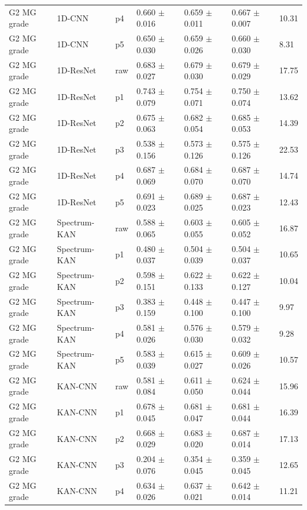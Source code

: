 {\begin{longtable}{L{2.35cm}L{2.4cm}L{1.0cm}L{2.35cm}L{2.25cm}L{2.25cm}L{1.45cm}}
G2 MG grade & 1D-CNN & p4 & 0.660 $\pm$ 0.016 & 0.659 $\pm$ 0.011 & 0.667 $\pm$ 0.007 & 10.31 \\
G2 MG grade & 1D-CNN & p5 & 0.650 $\pm$ 0.030 & 0.659 $\pm$ 0.026 & 0.660 $\pm$ 0.030 & 8.31 \\
G2 MG grade & 1D-ResNet & raw & 0.683 $\pm$ 0.027 & 0.679 $\pm$ 0.030 & 0.679 $\pm$ 0.029 & 17.75 \\
G2 MG grade & 1D-ResNet & p1 & 0.743 $\pm$ 0.079 & 0.754 $\pm$ 0.071 & 0.750 $\pm$ 0.074 & 13.62 \\
G2 MG grade & 1D-ResNet & p2 & 0.675 $\pm$ 0.063 & 0.682 $\pm$ 0.054 & 0.685 $\pm$ 0.053 & 14.39 \\
G2 MG grade & 1D-ResNet & p3 & 0.538 $\pm$ 0.156 & 0.573 $\pm$ 0.126 & 0.575 $\pm$ 0.126 & 22.53 \\
G2 MG grade & 1D-ResNet & p4 & 0.687 $\pm$ 0.069 & 0.684 $\pm$ 0.070 & 0.687 $\pm$ 0.070 & 14.74 \\
G2 MG grade & 1D-ResNet & p5 & 0.691 $\pm$ 0.023 & 0.689 $\pm$ 0.025 & 0.687 $\pm$ 0.023 & 12.43 \\
G2 MG grade & Spectrum-KAN & raw & 0.588 $\pm$ 0.065 & 0.603 $\pm$ 0.055 & 0.605 $\pm$ 0.052 & 16.87 \\
G2 MG grade & Spectrum-KAN & p1 & 0.480 $\pm$ 0.037 & 0.504 $\pm$ 0.039 & 0.504 $\pm$ 0.037 & 10.65 \\
G2 MG grade & Spectrum-KAN & p2 & 0.598 $\pm$ 0.151 & 0.622 $\pm$ 0.133 & 0.622 $\pm$ 0.127 & 10.04 \\
G2 MG grade & Spectrum-KAN & p3 & 0.383 $\pm$ 0.159 & 0.448 $\pm$ 0.100 & 0.447 $\pm$ 0.100 & 9.97 \\
G2 MG grade & Spectrum-KAN & p4 & 0.581 $\pm$ 0.026 & 0.576 $\pm$ 0.030 & 0.579 $\pm$ 0.032 & 9.28 \\
G2 MG grade & Spectrum-KAN & p5 & 0.583 $\pm$ 0.039 & 0.615 $\pm$ 0.027 & 0.609 $\pm$ 0.026 & 10.57 \\
G2 MG grade & KAN-CNN & raw & 0.581 $\pm$ 0.084 & 0.611 $\pm$ 0.050 & 0.624 $\pm$ 0.044 & 15.96 \\
G2 MG grade & KAN-CNN & p1 & 0.678 $\pm$ 0.045 & 0.681 $\pm$ 0.047 & 0.681 $\pm$ 0.044 & 16.39 \\
G2 MG grade & KAN-CNN & p2 & 0.668 $\pm$ 0.029 & 0.683 $\pm$ 0.020 & 0.687 $\pm$ 0.014 & 17.13 \\
G2 MG grade & KAN-CNN & p3 & 0.204 $\pm$ 0.076 & 0.354 $\pm$ 0.045 & 0.359 $\pm$ 0.045 & 12.65 \\
G2 MG grade & KAN-CNN & p4 & 0.634 $\pm$ 0.026 & 0.637 $\pm$ 0.021 & 0.642 $\pm$ 0.014 & 11.21 \\

\end{longtable}}
